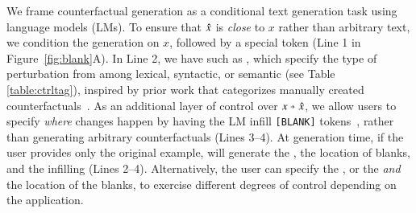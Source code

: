 We frame counterfactual generation as a conditional text generation task using language models (LMs). To ensure that $\hat{x}$ is \emph{close} to $x$ rather than arbitrary text, we condition the generation on $x$, followed by a special token (Line 1 in Figure~\ref{fig:blank}A).
In Line 2, we have \emph{\tagstrs} \cite{ctrl} such as , which specify the type of perturbation from among lexical, syntactic, or semantic \tagstrshorts (see Table \ref{table:ctrltag}), inspired by prior work that categorizes manually created counterfactuals~\cite{kaushik2019learning, gardner2020contrast}.
As an additional layer of control over $x \veryshortarrow \xp$, %
we allow users to specify \emph{where} changes happen by having the LM infill \texttt{[BLANK]} tokens~\cite{donahue2020enabling}, rather than generating arbitrary counterfactuals (Lines 3--4).
At generation time, if the user provides only the original example, \sysname will generate the \tagstr, the location of blanks, and the infilling (Lines 2--4). 
Alternatively, the user can specify the \tagstr, or the \tagstr \emph{and} the location of the blanks, to exercise different degrees of control depending on the application.




